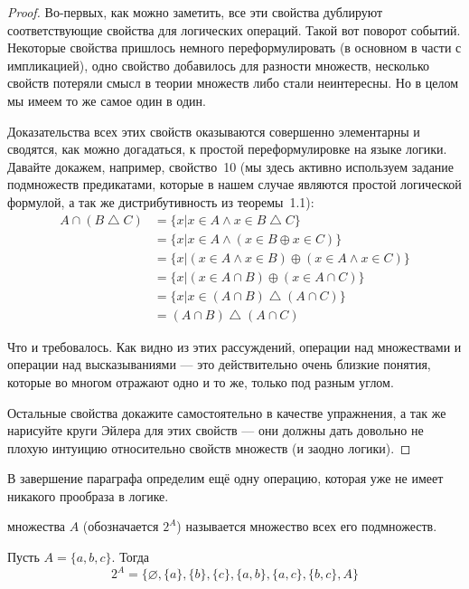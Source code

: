 \begin{proof}Во-первых, как можно заметить, все эти свойства дублируют соответствующие свойства для логических операций. Такой вот поворот событий. Некоторые свойства пришлось немного переформулировать (в основном в части с импликацией), одно свойство добавилось для разности множеств, несколько свойств потеряли смысл в теории множеств либо стали неинтересны. Но в целом мы имеем то же самое один в один.

Доказательства всех этих свойств оказываются совершенно элементарны и сводятся, как можно догадаться, к простой переформулировке на языке логики. Давайте докажем, например, свойство~10 (мы здесь активно используем задание подмножеств предикатами, которые в нашем случае являются простой логической формулой, а так же дистрибутивность из теоремы~1.1):
\begin{align*}
A \cap (B \bigtriangleup C) &= \{x|x\in A \wedge x \in B\bigtriangleup C\} \\
& = \{x|x\in A \wedge (x \in B \oplus x \in C)\}\\
& = \{x|(x\in A \wedge x \in B) \oplus (x \in A \wedge x \in C)\}\\
& = \{x|(x\in A \cap B) \oplus (x \in A \cap C)\} \\
& = \{x|x\in (A \cap B) \bigtriangleup (A \cap C)\}\\
& = (A \cap B) \bigtriangleup (A \cap C)
\end{align*}

Что и требовалось. Как видно из этих рассуждений, операции над множествами и операции над высказываниями — это действительно очень близкие понятия, которые во многом отражают одно и то же, только под разным углом.

Остальные свойства докажите самостоятельно в качестве упражнения, а так же нарисуйте круги Эйлера для этих свойств — они должны дать довольно не плохую интуицию относительно свойств множеств (и заодно логики).
\end{proof}

В завершение параграфа определим ещё одну операцию, которая уже не имеет никакого прообраза в логике.

\begin{definition}
 множества $A$ (обозначается $2^A$) называется множество всех его подмножеств.
\end{definition}

\begin{example}
Пусть $A = \{a, b, c\}$. Тогда
$$2^A = \{\varnothing, \{a\}, \{b\}, \{c\}, \{a, b\}, \{a, c\}, \{b, c\}, A\}$$
\end{example}

